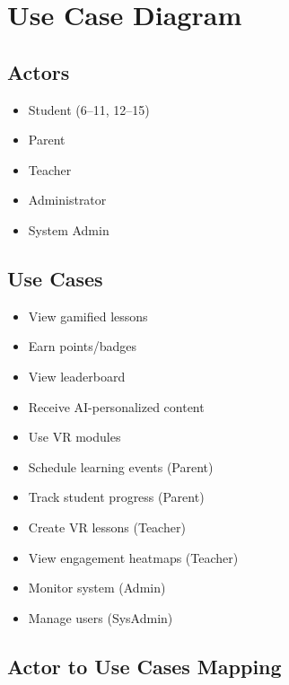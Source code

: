 \documentclass[12pt,a4paper]{article}
\renewcommand{\arraystretch}{1.4}
\begin{document}
\section{Use Case Diagram}

\subsection*{Actors}
\begin{itemize}
  \item Student (6–11, 12–15)
  \item Parent
  \item Teacher
  \item Administrator
  \item System Admin
\end{itemize}

\subsection*{Use Cases}
\begin{itemize}
  \item View gamified lessons
  \item Earn points/badges
  \item View leaderboard
  \item Receive AI-personalized content
  \item Use VR modules
  \item Schedule learning events (Parent)
  \item Track student progress (Parent)
  \item Create VR lessons (Teacher)
  \item View engagement heatmaps (Teacher)
  \item Monitor system (Admin)
  \item Manage users (SysAdmin)
\end{itemize}

\subsection*{Actor to Use Cases Mapping}

\renewcommand{\arraystretch}{1.3}
\end{document}
